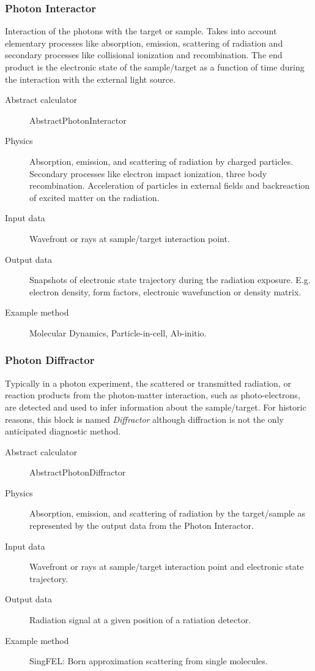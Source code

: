 \documentclass[a4paper]{article}
\begin{document}
\subsubsection{Photon Interactor}
Interaction of the photons with the target or sample. Takes into account elementary processes like absorption, emission, scattering of radiation and secondary processes like collisional ionization and recombination. The end product is the electronic state of the sample/target as a function of time during the interaction with the external light source.
\begin{description}
  \item[Abstract calculator] AbstractPhotonInteractor
  \item[Physics] Absorption, emission, and scattering of radiation by charged particles. Secondary processes like electron impact ionization, three
    body recombination. Acceleration of particles in external fields and backreaction of excited matter on the radiation.
  \item[Input data] Wavefront or rays at sample/target interaction point.
  \item[Output data] Snapshots of electronic state trajectory during the radiation exposure. E.g. electron density, form factors, electronic
    wavefunction or density matrix.
  \item[Example method] Molecular Dynamics, Particle-in-cell, Ab-initio.
\end{description}

\subsubsection{Photon Diffractor}
Typically in a photon experiment, the scattered or transmitted radiation, or reaction products from the photon-matter
interaction, such as photo-electrons, are detected and used to infer information about the sample/target. For historic reasons, this block is named
\textit{Diffractor} although diffraction is not the only anticipated diagnostic method.
\begin{description}
  \item[Abstract calculator] AbstractPhotonDiffractor
  \item[Physics] Absorption, emission, and scattering of radiation by the target/sample as represented by the output data from the Photon Interactor.
  \item[Input data] Wavefront or rays at sample/target interaction point and electronic state trajectory.
  \item[Output data] Radiation signal at a given position of a ratiation detector.
  \item[Example method] SingFEL: Born approximation scattering from single molecules.
\end{description}
\end{document}
